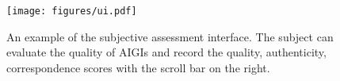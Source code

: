 \begin{figure}[t]
  \centering
  \texttt{[image: figures/ui.pdf]}
  \caption{An example of the subjective assessment interface. The subject can  evaluate the quality of AIGIs and record the quality, authenticity, correspondence scores with the scroll bar on the right.}
\end{figure}